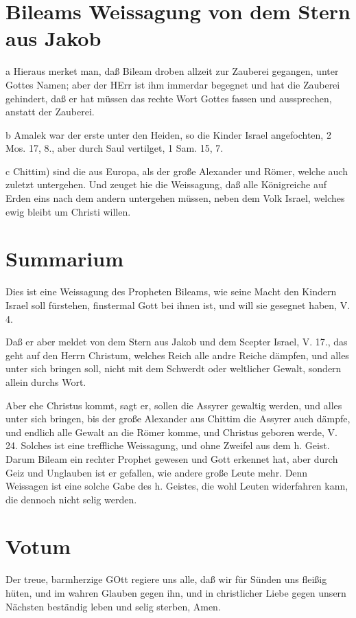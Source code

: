 \section{Bileams Weissagung von dem Stern aus Jakob}

a Hieraus merket man, daß Bileam droben allzeit zur Zauberei gegangen, unter Gottes Namen; aber der HErr ist ihm immerdar begegnet und hat die Zauberei gehindert, daß er hat müssen das rechte Wort Gottes fassen und aussprechen, anstatt der Zauberei.

b Amalek war der erste unter den Heiden, so die Kinder Israel angefochten, 2 Mos. 17, 8., aber durch Saul vertilget, 1 Sam. 15, 7.

c Chittim) sind die aus Europa, als der große Alexander und Römer, welche auch zuletzt untergehen. Und zeuget hie die Weissagung, daß alle Königreiche auf Erden eins nach dem andern untergehen müssen, neben dem Volk Israel, welches ewig bleibt um Christi willen.

\section{Summarium}

Dies ist eine Weissagung des Propheten Bileams, wie seine Macht den Kindern Israel soll fürstehen, finstermal Gott bei ihnen ist, und will sie gesegnet haben, V. 4.

Daß er aber meldet von dem Stern aus Jakob und dem Scepter Israel, V. 17., das geht auf den Herrn Christum, welches Reich alle andre Reiche dämpfen, und alles unter sich bringen soll, nicht mit dem Schwerdt oder weltlicher Gewalt, sondern allein durchs Wort.

Aber ehe Christus kommt, sagt er, sollen die Assyrer gewaltig werden, und alles unter sich bringen, bis der große Alexander aus Chittim die Assyrer auch dämpfe, und endlich alle Gewalt an die Römer komme, und Christus geboren werde, V. 24. Solches ist eine treffliche Weissagung, und ohne Zweifel aus dem h. Geist. Darum Bileam ein rechter Prophet gewesen und Gott erkennet hat, aber durch Geiz und Unglauben ist er gefallen, wie andere große Leute mehr. Denn Weissagen ist eine solche Gabe des h. Geistes, die wohl Leuten widerfahren kann, die dennoch nicht selig werden.

\section{Votum}

Der treue, barmherzige GOtt regiere uns alle, daß wir für Sünden uns fleißig hüten, und im wahren Glauben gegen ihn, und in christlicher Liebe gegen unsern Nächsten beständig leben und selig sterben, Amen.

